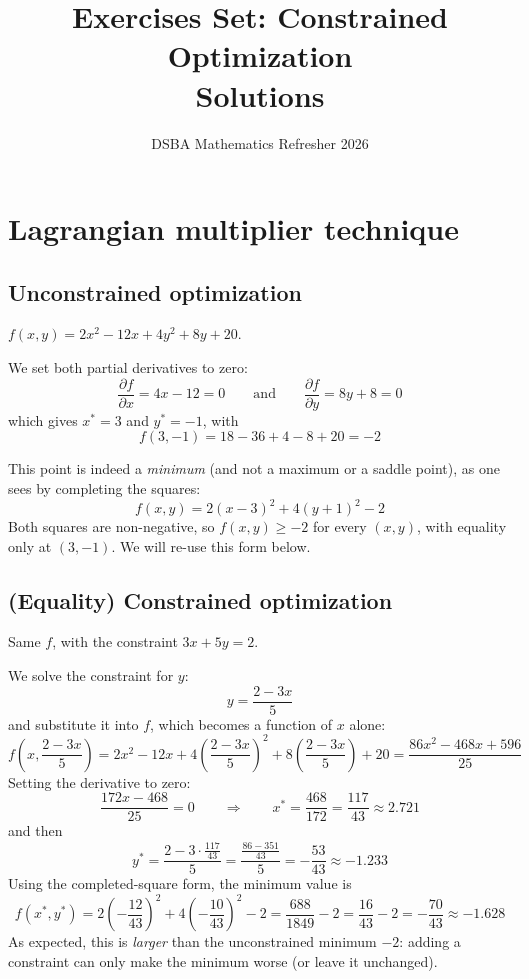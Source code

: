 \documentclass[]{article}
\title{Exercises Set: Constrained Optimization\\ \large Solutions}
\author{DSBA Mathematics Refresher 2026}
\date{}
\begin{document}
	\maketitle

	\section{Lagrangian multiplier technique}

	\subsection{Unconstrained optimization}

	$f(x,y) = 2x^2 - 12x + 4y^2 + 8y + 20$.

	We set both partial derivatives to zero:
	$$
	\frac{\partial f}{\partial x} = 4x - 12 = 0
	\qquad \text{and} \qquad
	\frac{\partial f}{\partial y} = 8y + 8 = 0
	$$
	which gives $x^* = 3$ and $y^* = -1$, with
	$$
	f(3,-1) = 18 - 36 + 4 - 8 + 20 = -2
	$$

	This point is indeed a \textit{minimum} (and not a maximum or a saddle point), as one sees by completing the squares:
	$$
	f(x,y) = 2(x-3)^2 + 4(y+1)^2 - 2
	$$
	Both squares are non-negative, so $f(x,y) \geq -2$ for every $(x,y)$, with equality only at $(3,-1)$.
	We will re-use this form below.

	\subsection{(Equality) Constrained optimization}

	Same $f$, with the constraint $3x + 5y = 2$.

	We solve the constraint for $y$:
	$$
	y = \frac{2 - 3x}{5}
	$$
	and substitute it into $f$, which becomes a function of $x$ alone:
	$$
	f\left(x, \frac{2-3x}{5}\right)
	= 2x^2 - 12x + 4\left(\frac{2-3x}{5}\right)^2 + 8\left(\frac{2-3x}{5}\right) + 20
	= \frac{86x^2 - 468x + 596}{25}
	$$
	Setting the derivative to zero:
	$$
	\frac{172x - 468}{25} = 0
	\qquad \Longrightarrow \qquad
	x^* = \frac{468}{172} = \frac{117}{43} \approx 2.721
	$$
	and then
	$$
	y^* = \frac{2 - 3 \cdot \frac{117}{43}}{5} = \frac{\frac{86 - 351}{43}}{5} = -\frac{53}{43} \approx -1.233
	$$
	Using the completed-square form, the minimum value is
	$$
	f(x^*,y^*) = 2\left(-\frac{12}{43}\right)^2 + 4\left(-\frac{10}{43}\right)^2 - 2 = \frac{688}{1849} - 2 = \frac{16}{43} - 2 = -\frac{70}{43} \approx -1.628
	$$
	As expected, this is \textit{larger} than the unconstrained minimum $-2$: adding a constraint can only make the minimum worse (or leave it unchanged).
\end{document}
